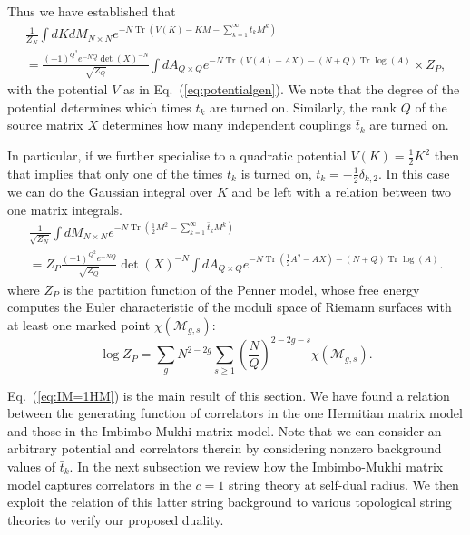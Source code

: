 \documentclass[english]{article}
\DeclareMathOperator{\Tr}{Tr}
\let\mc=\mathcal
\begin{document}
Thus we have established that 
\begin{eqnarray}\label{eq:IM=gauss}
  &\frac{1}{Z_N} \int dK dM_{N \times N} e^{+ N \Tr \left( V(K) - KM - \sum_{k=1}^{\infty} \bar{t}_k  M^{k}\right)} &\nonumber \\ 
 & = \frac{(-1)^{Q^2}e^{-NQ}\det(X)^{-N}}{\sqrt{Z_{Q}}} \int dA_{Q\times Q} e^{-N \Tr \left(V(A)-AX \right)-(N+Q)\Tr \log(A)} \times Z_P, & 
\end{eqnarray}
with the potential $V$ as in Eq.~(\ref{eq:potentialgen}).
We note that the degree of the potential determines which times $t_k$ are turned on. Similarly, the rank $Q$ of the source matrix 
$X$ determines how many independent couplings $\bar{t}_k$ are turned on. 

In particular, if we further specialise
to a quadratic potential $V(K)= \frac{1}{2}K^2$
then that implies that only one of the times $t_k$ is turned on,  
$t_k=-\frac{1}{2}\delta_{k,2}$. In this case we can do the Gaussian integral over $K$ and be left with a relation between two one matrix integrals.
\begin{eqnarray}\label{eq:IM=1HM}
  &\frac{1}{\sqrt{Z_{N}}}\int  dM_{N \times N} e^{-N \Tr \left( \frac{1}{2}M^2 - \sum_{k=1}^{\infty} \bar{t}_k  M^{k}\right)} &\nonumber \\ 
 & = Z_{P} \frac{(-1)^{Q^2}e^{-NQ}}{\sqrt{Z_{Q}}}\det(X)^{-N} \int dA_{Q\times Q} e^{-N \Tr \left(\frac{1}{2}A^2-AX \right)-(N+Q)\Tr \log(A)}  . &  
\end{eqnarray}
where $Z_P$ is the partition function of the Penner model, whose free energy computes the Euler characteristic of the moduli space of Riemann surfaces with at least one marked point $\chi(\mc{M}_{g,s})$:
\begin{equation}
   \log Z_{P} = \sum_{g} N^{2-2g}\sum_{s \geq 1} \left(\frac{N}{Q} \right)^{2-2g-s} \chi\left(\mc{M}_{g,s} \right).
\end{equation}

Eq.~(\ref{eq:IM=1HM}) is the main result of this section. 
We have found a relation between the generating function of correlators in the one Hermitian matrix model and those in the Imbimbo-Mukhi matrix model. Note that we can consider an arbitrary potential and correlators therein by considering nonzero background values of $\bar{t}_k$. 
In the next subsection we review how the Imbimbo-Mukhi matrix model captures correlators in the $c=1$ string theory at self-dual radius. We then exploit the relation of this latter string background to various topological string theories to verify our proposed duality. 
\end{document}

